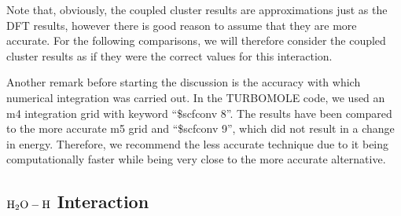 \documentclass[8.5pt,twoside,twocolumn]{article}
\theoremstyle{standard}
\begin{document}
Note that, obviously, the coupled cluster results are approximations just as the DFT results, however
there is good reason to assume that they are more accurate. For the following comparisons, we will
therefore consider the coupled cluster results as if they were the correct values for this
interaction.

Another remark before starting the discussion is the accuracy with which
numerical integration was carried out. In the \mbox{TURBOMOLE} code, we used an
m4 integration grid with keyword ``\$scfconv 8''. The results have been compared
to the more accurate m5 grid and ``\$scfconv 9'', which did not result in
a change in energy.
Therefore, we recommend the less accurate technique due to it being
computationally faster while being very close to the more accurate alternative.

\subsection{$\mbox{\ensuremath{\text H _2 \text O-\text H}}$ Interaction}
\end{document}

